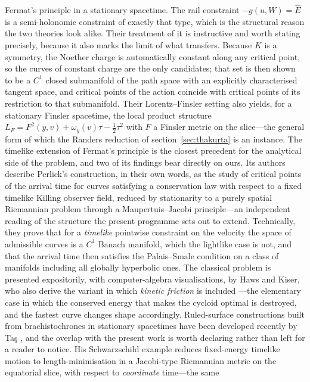 \documentclass[12pt]{iopart}
\theoremstyle{plain}
\theoremstyle{definition}
\theoremstyle{remark}
\newcommand{\Ehat}{\hat E}
\begin{document}
Fermat's principle in a stationary spacetime. The rail constraint $-g(u,W)=\Ehat$ is a
semi-holonomic constraint of exactly that type, which is the structural reason the two
theories look alike. Their treatment of it is instructive and worth stating precisely,
because it also marks the limit of what transfers. Because $K$ is a symmetry, the Noether
charge is automatically constant along any critical point, so the curves of constant
charge are the only candidates; that set is then shown to be a $C^1$ closed submanifold
of the path space with an explicitly characterised tangent space, and critical points of
the action coincide with critical points of its restriction to that submanifold. Their
Lorentz--Finsler setting also yields, for a stationary Finsler spacetime, the local
product structure $L_F=F^2(y,v)+\omega_y(v)\tau-\tfrac12\tau^2$ with $F$ a Finsler metric
on the slice---the general form of which the Randers reduction of
section~\ref{sec:thakurta} is an instance. The timelike extension of Fermat's principle
\cite{GiannoniMasielloPiccione1998} is the closest precedent for the analytical side of
the problem, and two of its findings bear directly on ours. Its authors describe Perlick's
construction, in their own words, as the study of critical points of the arrival time for
curves satisfying a conservation law with respect to a fixed timelike Killing observer
field, reduced by stationarity to a purely spatial Riemannian problem through a
Maupertuis--Jacobi principle---an independent reading of the structure the present
programme sets out to extend. Technically, they prove that for a \emph{timelike} pointwise
constraint on the velocity the space of admissible curves is a $C^1$ Banach manifold,
which the lightlike case is not, and that the arrival time then satisfies the
Palais--Smale condition on a class of manifolds including all globally hyperbolic ones.
The classical
problem is presented expositorily, with computer-algebra visualisations, by Haws and
Kiser, who also derive the variant in which \emph{kinetic friction} is included
\cite[\S3]{HawsKiser1995}---the elementary case in which the conserved energy that
makes the cycloid optimal is destroyed, and the fastest curve changes shape
accordingly. Ruled-surface constructions
built from brachistochrones in stationary spacetimes have been developed recently by
Ta\c{s} \cite{Tas2025}, and the overlap with the present work is worth declaring
rather than left for a reader to notice. His Schwarzschild example reduces
fixed-energy timelike motion to length-minimisation in a Jacobi-type Riemannian
metric on the equatorial slice, with respect to \emph{coordinate} time---the same
\end{document}
